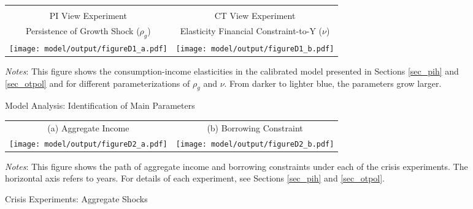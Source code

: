 \documentclass[12pt]{article}
\begin{document}
\begin{spacing}{1.5}
\begin{figure}[H]
\caption{Model Analysis: Identification of Main Parameters}
\label{fig: ident}
\begin{tabular}{cc}
\vspace{-.7em} \\
PI View Experiment & CT View Experiment \vspace{.1em}  \\
Persistence of Growth Shock ($\rho_g$) & Elasticity Financial Constraint-to-Y ($\nu$) \\
\texttt{[image: model/output/figureD1\_a.pdf]} &
\texttt{[image: model/output/figureD1\_b.pdf]} \\
\end{tabular}
\flushleft\raggedright{}\textit{\footnotesize{}Notes}{: \footnotesize{This figure shows the consumption-income elasticities in the calibrated model presented in Sections \ref{sec_pih} and \ref{sec_otpol} and for different parameterizations of $\rho_g$ and $\nu$. From darker to lighter blue, the parameters grow larger.}}{\footnotesize\par}
\end{figure}



\begin{figure}[H]
\caption{Crisis Experiments: Aggregate Shocks}
\label{fig: shock}
\begin{tabular}{cc}
(a) Aggregate Income & (b) Borrowing Constraint \\
\texttt{[image: model/output/figureD2\_a.pdf]} &
\texttt{[image: model/output/figureD2\_b.pdf]}  \\
\end{tabular}
\raggedright{}\textit{\footnotesize{}Notes}{: \footnotesize{
This figure shows the path of aggregate income and borrowing constraints under each of the crisis experiments. The horizontal axis refers to years. For details of each experiment, see Sections \ref{sec_pih} and \ref{sec_otpol}. }}{\footnotesize\par}
\end{figure}



\end{spacing}
\end{document}
